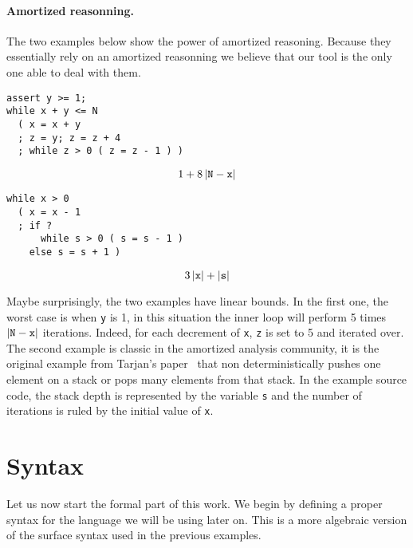 \documentclass[nocopyrightspace,preprint]{sigplanconf}
\begin{document}
\paragraph{Amortized reasonning.}
The two examples below show the power of amortized reasoning.
Because they essentially rely on an amortized reasonning we believe
that our tool is the only one able to deal with them.

\begin{minipage}[b]{0.45\textwidth}
\begin{lstlisting}
assert y >= 1;
while x + y <= N
  ( x = x + y
  ; z = y; z = z + 4
  ; while z > 0 ( z = z - 1 ) )
\end{lstlisting}
$$
1 + 8\,|{\tt N} - {\tt x}|
$$
\end{minipage}
\begin{minipage}[b]{0.45\textwidth}
\begin{lstlisting}
while x > 0
  ( x = x - 1
  ; if ?
      while s > 0 ( s = s - 1 )
    else s = s + 1 )
\end{lstlisting}
$$
3\,|{\tt x}| + |{\tt s}|
$$
\end{minipage}

\hspace{1ex}

Maybe surprisingly, the two examples have linear bounds.  In the first one, the
worst case is when {\tt y} is 1, in this situation the inner loop will perform 5 times
$|{\tt N} - {\tt x}|$ iterations. Indeed, for each decrement of {\tt x}, {\tt z} is set
to 5 and iterated over.  The second example is classic in the amortized analysis
community, it is the original example from Tarjan's paper~\cite{Tarjan-amort} that
non deterministically pushes one element on a stack or pops many elements from
that stack.  In the example source code, the stack depth is represented by the
variable {\tt s} and the number of iterations is ruled by the initial value of {\tt x}.

\section{Syntax}

Let us now start the formal part of this work.  We begin by defining
a proper syntax for the language we will be using later on.  This is
a more algebraic version of the surface syntax used in the previous
examples.
%
\end{document}
